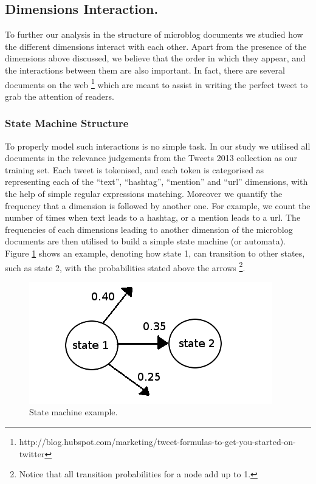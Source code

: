\subsection{Dimensions Interaction.}

To further our analysis in the structure of microblog documents we studied how the different dimensions interact with each other. Apart from the presence of the dimensions above discussed, we believe that the order in which they appear, and the interactions between them are also important. In fact, there are several documents on the web \footnote{http://blog.hubspot.com/marketing/tweet-formulas-to-get-you-started-on-twitter} which are meant to assist in writing the perfect tweet to grab the attention of readers.


\subsubsection{State Machine Structure}
To properly model such interactions is no simple task. In our study we utilised all documents in the relevance judgements from the Tweets 2013 collection as our training set. Each tweet is tokenised, and each token is categorised as representing each of the ``text'', ``hashtag'', ``mention'' and ``url'' dimensions, with the help of simple regular expressions matching. Moreover we quantify the frequency that a dimension is followed by another one. For example, we count the number of times when text leads to a hashtag, or a mention leads to a url. The frequencies of each dimensions leading to another dimension of the microblog documents are then utilised to build a simple state machine (or automata). Figure \ref{automataexample} shows an example, denoting how state 1, can transition to other states, such as state 2, with the probabilities stated above the arrows \footnote{ Notice that all transition probabilities for a node add up to 1.}. 



\begin{figure}[h!]
\vspace{0.5cm}
\hspace{3.5cm}
\includegraphics[scale=0.6]{example.png}
\caption{State machine example.}
\label{automataexample}
\vspace{0.5cm}
\end{figure}



